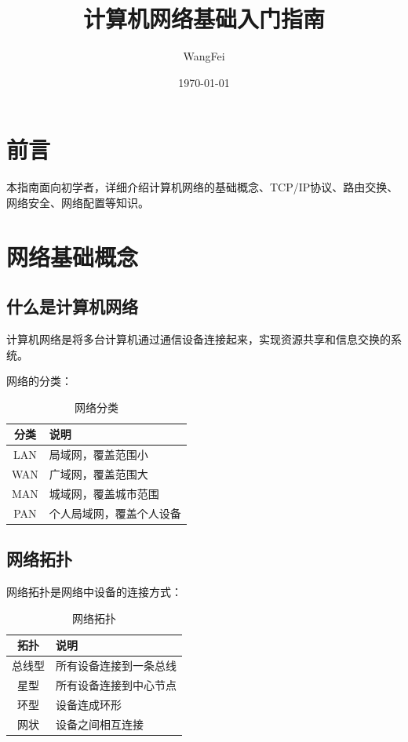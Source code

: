 \documentclass[12pt,UTF8]{ctexbook}
\title{\heiti\zihao{0} 计算机网络基础入门指南}
\author{WangFei}
\date{\today}
\begin{document}
\maketitle
\tableofcontents

\frontmatter
\chapter{前言}

本指南面向初学者，详细介绍计算机网络的基础概念、TCP/IP协议、路由交换、网络安全、网络配置等知识。

\mainmatter

\chapter{网络基础概念}
\label{chap:network_basics}

\section{什么是计算机网络}
\label{sec:what_is_network}

计算机网络是将多台计算机通过通信设备连接起来，实现资源共享和信息交换的系统。

网络的分类：
\begin{table}[htbp]
    \centering
    \caption{网络分类}
    \begin{tabular}{|c|p{8cm}|}
        \hline
        \textbf{分类} & \textbf{说明} \\
        \hline
        LAN & 局域网，覆盖范围小 \\
        \hline
        WAN & 广域网，覆盖范围大 \\
        \hline
        MAN & 城域网，覆盖城市范围 \\
        \hline
        PAN & 个人局域网，覆盖个人设备 \\
        \hline
    \end{tabular}
\end{table}

\section{网络拓扑}
\label{sec:network_topology}

网络拓扑是网络中设备的连接方式：
\begin{table}[htbp]
    \centering
    \caption{网络拓扑}
    \begin{tabular}{|c|p{8cm}|}
        \hline
        \textbf{拓扑} & \textbf{说明} \\
        \hline
        总线型 & 所有设备连接到一条总线 \\
        \hline
        星型 & 所有设备连接到中心节点 \\
        \hline
        环型 & 设备连成环形 \\
        \hline
        网状 & 设备之间相互连接 \\
        \hline
    \end{tabular}
\end{table}
\end{document}
